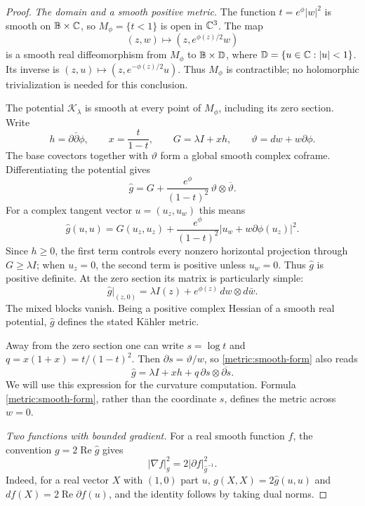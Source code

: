 \begin{proof}
\emph{The domain and a smooth positive metric.}
The function $t=e^\phi|w|^2$ is smooth on $\mathbb B\times\mathbb C$, so
$M_\phi=\{t<1\}$ is open in $\mathbb C^3$.  The map
\[
 (z,w)\longmapsto (z,e^{\phi(z)/2}w)
\]
is a smooth real diffeomorphism from $M_\phi$ to $\mathbb B\times\mathbb D$,
where $\mathbb D=\{u\in\mathbb C:|u|<1\}$.  Its inverse is
$(z,u)\mapsto(z,e^{-\phi(z)/2}u)$.  Thus $M_\phi$ is contractible;
no holomorphic trivialization is needed for this conclusion.

The potential $\mathcal K_\lambda$ is smooth at every point of
$M_\phi$, including its zero section.  Write
\[
 h=\partial\bar\partial\phi,\qquad
 x=\frac{t}{1-t},\qquad G=\lambda I+xh,
 \qquad \vartheta=dw+w\partial\phi.
\]
The base covectors together with $\vartheta$ form a global smooth
complex coframe.  Differentiating the potential gives
\begin{equation}\label{metric:smooth-form}
 \widehat g
 =G+\frac{e^\phi}{(1-t)^2}\,
       \vartheta\otimes\overline{\vartheta}.
\end{equation}
For a complex tangent vector $u=(u_z,u_w)$ this means
\[
 \widehat g(u,u)
 =G(u_z,u_z)
  +\frac{e^\phi}{(1-t)^2}
      |u_w+w\partial\phi(u_z)|^2.
\]
Since $h\ge0$, the first term controls every nonzero horizontal
projection through $G\ge\lambda I$; when $u_z=0$, the second term is
positive unless $u_w=0$.  Thus $\widehat g$ is positive definite.
At the zero section its matrix is particularly simple:
\begin{equation}\label{metric:axis}
 \widehat g\big|_{(z,0)}
 =\lambda I(z)+e^{\phi(z)}\,dw\otimes d\bar w.
\end{equation}
The mixed blocks vanish.  Being a positive complex Hessian of a smooth
real potential, $\widehat g$ defines the stated K\"ahler metric.

Away from the zero section one can write $s=\log t$ and
$q=x(1+x)=t/(1-t)^2$.  Then $\partial s=\vartheta/w$, so
\eqref{metric:smooth-form} also reads
\begin{equation}\label{metric:log-form}
 \widehat g=\lambda I+xh+
             q\,\partial s\otimes\overline{\partial s}.
\end{equation}
We will use this expression for the curvature computation.  Formula
\eqref{metric:smooth-form}, rather than the coordinate $s$, defines the
metric across $w=0$.

\emph{Two functions with bounded gradient.}
For a real smooth function $f$, the convention
$g=2\operatorname{Re}\widehat g$ gives
\begin{equation}\label{metric:gradient-convention}
 |\nabla f|_g^2=2|\partial f|_{\widehat g^{-1}}^2.
\end{equation}
Indeed, for a real vector $X$ with $(1,0)$ part $u$,
$g(X,X)=2\widehat g(u,u)$ and
$df(X)=2\operatorname{Re}\partial f(u)$, and the identity follows
by taking dual norms.


\end{proof}
